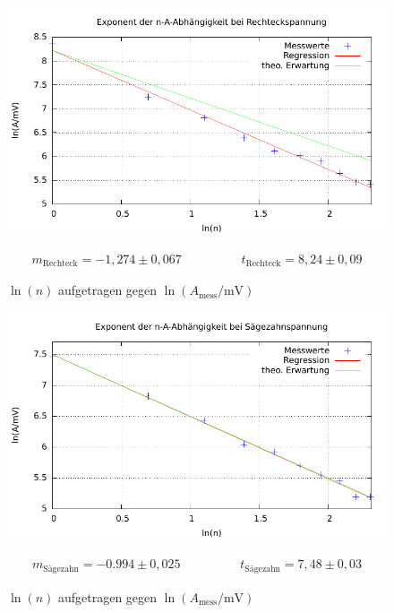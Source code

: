 \begin{figure}[H]
 \includegraphics[width=1\textwidth]{pics/rechteck.pdf}
 \caption{$\ln(n)$ aufgetragen gegen $\ln(A_{\text{mess}}/\text{mV})$}
 \label{pic_rechteckfit}
 \begin{align}
 m_{\text{Rechteck}} = -1,274 \pm 0,067 \hspace{2cm} t_{\text{Rechteck}} = 8,24 \pm 0,09
\end{align}
\end{figure}
\begin{figure}[H]
 \includegraphics[width=1\textwidth]{pics/saegezahn.pdf}
 \caption{$\ln(n)$ aufgetragen gegen $\ln(A_{\text{mess}}/\text{mV})$}
 \label{pic_saegezahnfit}
 \begin{align}
 m_{\text{Sägezahn}} = -0.994 \pm 0,025 \hspace{2cm} t_{\text{Sägezahn}} = 7,48 \pm 0,03
\end{align}
\end{figure}

